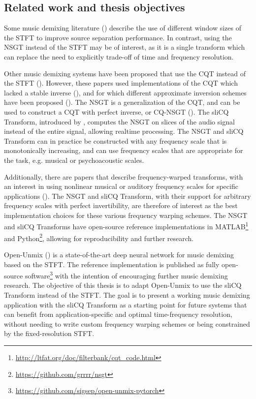 \documentclass[report.tex]{subfiles}
\begin{document}
\subsection{Related work and thesis objectives}

Some music demixing literature (\cite{fitzgerald1, driedger, tftradeoff1, tftradeoff2}) describe the use of different window sizes of the STFT to improve source separation performance. In contrast, using the NSGT instead of the STFT may be of interest, as it is a single transform which can replace the need to explicitly trade-off of time and frequency resolution.

Other music demixing systems have been proposed that use the CQT instead of the STFT (\cite{fitzgerald2, cqtseparation, bettermusicsep}). However, these papers used implementations of the CQT which lacked a stable inverse (\cite{lackinverse}), and for which different approximate inversion schemes have been proposed (\cite{klapuricqt, fitzgeraldcqt}). The NSGT is a generalization of the CQT, and can be used to construct a CQT with perfect inverse, or CQ-NSGT (\cite{invertiblecqt, variableq1}). The sliCQ Transform, introduced by \textcite{slicq}, computes the NSGT on slices of the audio signal instead of the entire signal, allowing realtime processing. The NSGT and sliCQ Transform can in practice be constructed with any frequency scale that is monotonically increasing, and can use frequency scales that are appropriate for the task, e.g. musical or psychoacoustic scales.

Additionally, there are papers that describe frequency-warped transforms, with an interest in using nonlinear musical or auditory frequency scales for specific applications (\cite{warped1, warped2, earlywarped1, earlywarped2, warpedcomparison, warpedpsycho}). The NSGT and sliCQ Transform, with their support for arbitrary frequency scales with perfect invertibility, are therefore of interest as the best implementation choices for these various frequency warping schemes. The NSGT and sliCQ Transforms have open-source reference implementations in MATLAB\footnote{\url{http://ltfat.org/doc/filterbank/cqt_code.html}} and Python\footnote{\url{https://github.com/grrrr/nsgt}}, allowing for reproducibility and further research.

Open-Unmix (\cite{umx}) is a state-of-the-art deep neural network for music demixing based on the STFT. The reference implementation is published as fully open-source software\footnote{\url{https://github.com/sigsep/open-unmix-pytorch}} with the intention of encouraging further music demixing research. The objective of this thesis is to adapt Open-Unmix to use the sliCQ Transform instead of the STFT. The goal is to present a working music demixing application with the sliCQ Transform as a starting point for future systems that can benefit from application-specific and optimal time-frequency resolution, without needing to write custom frequency warping schemes or being constrained by the fixed-resolution STFT.
\end{document}
